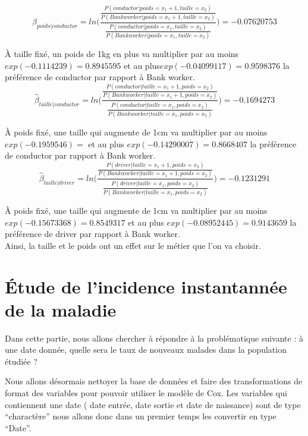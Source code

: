 \documentclass[
]{article}
\begin{document}
\[\hat{\beta}_{poids|conductor}=ln \bigg(\frac{\frac{P(conductor| poids = x_1+1, taille=x_2)}{P(Bank worker | poids = x_1+1, taille=x_2)}}{\frac{P(conductor | poids = x_1, taille=x_2)}{P(Bank worker | poids = x_1,taille=x_2)}}\bigg)=-0.07620753 \]

À taille fixé, un poids de 1kg en plus va multiplier par au moins
\(exp(-0.1114239)=0.8945595\) et au plus\(exp( -0.04099117)=0.9598376\)
la préférence de conductor par rapport à Bank worker.\\

\[\hat{\beta}_{taille|conductor}=ln \bigg(\frac{\frac{P(conductor| taille = x_1+1, poids=x_2)}{P(Bank worker | taille = x_1+1, poids=x_2)}}{\frac{P(conductor | taille = x_1, poids=x_2)}{P(Bank worker | taille = x_1,poids=x_2)}}\bigg)=-0.1694273\]

À poids fixé, une taille qui augmente de 1cm va multiplier par au moins
\(exp( -0.1959546)=\) et au plus \(exp( -0.14290007)=0.8668407\) la
préférence de conductor par rapport à Bank worker.\\

\[\hat{\beta}_{taille|driver}=ln \bigg(\frac{\frac{P(driver| taille = x_1+1, poids=x_2)}{P(Bank worker | taille = x_1+1, poids=x_2)}}{\frac{P(driver | taille = x_1, poids=x_2)}{P(Bank worker | taille = x_1,poids=x_2)}}\bigg)=-0.1231291\]

À poids fixé, une taille qui augmente de 1cm va multiplier par au moins
\(exp( -0.15673368)=0.8549317\) et au plus
\(exp( -0.08952445)=0.9143659\) la préférence de driver par rapport à
Bank worker.\\

Ainsi, la taille et le poids ont un effet sur le métier que l'on va
choisir.

\hypertarget{uxe9tude-de-lincidence-instantannuxe9e-de-la-maladie}{%
\section{Étude de l'incidence instantannée de la
maladie}\label{uxe9tude-de-lincidence-instantannuxe9e-de-la-maladie}}

Dans cette partie, nous allons chercher à répondre à la problématique
suivante : à une date donnée, quelle sera le taux de nouveaux malades
dans la population étudiée ?

Nous allons désormais nettoyer la base de données et faire des
transformations de format des variables pour pouvoir utiliser le modèle
de Cox. Les variables qui contiennent une date ( date entrée, date
sortie et date de naissance) sont de type ``charactère'' nous allons
donc dans un premier temps les convertir en type ``Date''.
\end{document}

